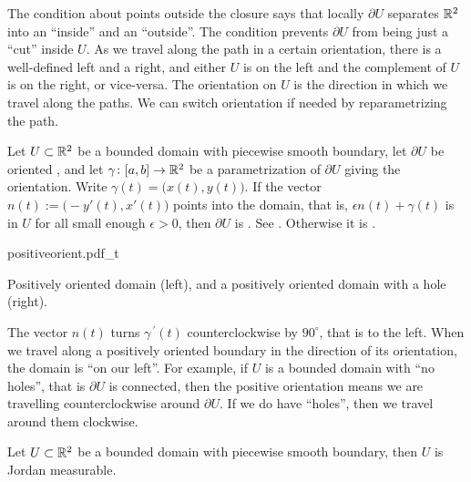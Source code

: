 The condition about points outside the closure says that locally $\partial U$
separates ${\mathbb{R}}^2$ into an ``inside'' and an ``outside''.  The condition prevents
$\partial U$ from being just a ``cut'' inside $U$.  As we travel
along the path in a certain orientation,
there is a well-defined left and a right, and either $U$ is on the left
and the complement of $U$ is on the right, or vice-versa.   
The orientation on $U$ is the direction in which we travel along the
paths.  We can switch orientation if needed by reparametrizing the
path.

\begin{defn}
Let $U \subset {\mathbb{R}}^2$ be a bounded domain with piecewise smooth boundary,
let $\partial U$ be oriented ,
and let $\gamma \colon [a,b] \to {\mathbb{R}}^2$ be a parametrization of $\partial U$
giving the orientation.  Write $\gamma(t) = \big(x(t),y(t)\bigr)$.
If the vector $n(t) := \bigl(-y'(t),x'(t)\bigr)$ points into the domain,
that is, $\epsilon n(t) + \gamma(t)$ is in $U$ for all small enough
$\epsilon > 0$, then $\partial U$ is
\emph{}.  
See .
Otherwise it is \emph{}.
\end{defn}

\begin{myfigureht}
{positiveorient.pdf_t}
\caption{Positively oriented domain (left), and a positively oriented
domain with a hole (right).\label{fig:positiveorient}}
\end{myfigureht}


The vector $n(t)$ turns $\gamma^{\:\prime}(t)$
counterclockwise by $90^\circ$, that is to the left.
When we travel along a positively oriented boundary
in the direction of its orientation,
the domain is ``on our left''.
For example,
if $U$ is a bounded domain with ``no holes'', that is $\partial U$
is connected, then the positive orientation means we are travelling
counterclockwise around $\partial U$.  If we do have ``holes'', then we
travel around them clockwise.

\begin{prop}
Let $U \subset {\mathbb{R}}^2$ be a bounded domain with piecewise smooth boundary, then
$U$ is Jordan measurable.
\end{prop}

